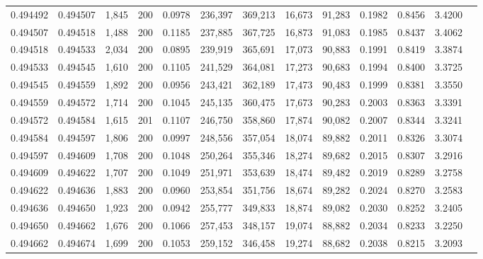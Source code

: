 \begin{tabular}{rrrrrrrrrrrrr}
0.494492 & 0.494507 & 1,845 & 200 &                                     0.0978 & 236,397 & 369,213 &  16,673 &  91,283 & 0.1982 & 0.8456 & 3.4200 \\
0.494507 & 0.494518 & 1,488 & 200 &                                     0.1185 & 237,885 & 367,725 &  16,873 &  91,083 & 0.1985 & 0.8437 & 3.4062 \\
0.494518 & 0.494533 & 2,034 & 200 &                                     0.0895 & 239,919 & 365,691 &  17,073 &  90,883 & 0.1991 & 0.8419 & 3.3874 \\
0.494533 & 0.494545 & 1,610 & 200 &                                     0.1105 & 241,529 & 364,081 &  17,273 &  90,683 & 0.1994 & 0.8400 & 3.3725 \\
0.494545 & 0.494559 & 1,892 & 200 &                                     0.0956 & 243,421 & 362,189 &  17,473 &  90,483 & 0.1999 & 0.8381 & 3.3550 \\
0.494559 & 0.494572 & 1,714 & 200 &                                     0.1045 & 245,135 & 360,475 &  17,673 &  90,283 & 0.2003 & 0.8363 & 3.3391 \\
0.494572 & 0.494584 & 1,615 & 201 &                                     0.1107 & 246,750 & 358,860 &  17,874 &  90,082 & 0.2007 & 0.8344 & 3.3241 \\
0.494584 & 0.494597 & 1,806 & 200 &                                     0.0997 & 248,556 & 357,054 &  18,074 &  89,882 & 0.2011 & 0.8326 & 3.3074 \\
0.494597 & 0.494609 & 1,708 & 200 &                                     0.1048 & 250,264 & 355,346 &  18,274 &  89,682 & 0.2015 & 0.8307 & 3.2916 \\
0.494609 & 0.494622 & 1,707 & 200 &                                     0.1049 & 251,971 & 353,639 &  18,474 &  89,482 & 0.2019 & 0.8289 & 3.2758 \\
0.494622 & 0.494636 & 1,883 & 200 &                                     0.0960 & 253,854 & 351,756 &  18,674 &  89,282 & 0.2024 & 0.8270 & 3.2583 \\
0.494636 & 0.494650 & 1,923 & 200 &                                     0.0942 & 255,777 & 349,833 &  18,874 &  89,082 & 0.2030 & 0.8252 & 3.2405 \\
0.494650 & 0.494662 & 1,676 & 200 &                                     0.1066 & 257,453 & 348,157 &  19,074 &  88,882 & 0.2034 & 0.8233 & 3.2250 \\
0.494662 & 0.494674 & 1,699 & 200 &                                     0.1053 & 259,152 & 346,458 &  19,274 &  88,682 & 0.2038 & 0.8215 & 3.2093 \\

\end{tabular}
